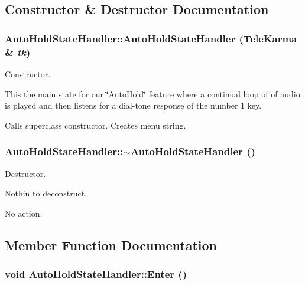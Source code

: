 \subsection{Constructor \& Destructor Documentation}
\hypertarget{classAutoHoldStateHandler_3537482b30296c65f6380f25291a8d3d}{
\subsubsection[{AutoHoldStateHandler}]{\setlength{\rightskip}{0pt plus 5cm}AutoHoldStateHandler::AutoHoldStateHandler ({\bf TeleKarma} \& {\em tk})}}
\label{classAutoHoldStateHandler_3537482b30296c65f6380f25291a8d3d}


Constructor. 

This the main state for our \char`\"{}AutoHold\char`\"{} feature where a continual loop of of audio is played and then listens for a dial-tone response of the number 1 key.

Calls superclass constructor. Creates menu string. \hypertarget{classAutoHoldStateHandler_b4022aa559ad037e07fbd4f9a395d3f6}{
\subsubsection[{$\sim$AutoHoldStateHandler}]{\setlength{\rightskip}{0pt plus 5cm}AutoHoldStateHandler::$\sim$AutoHoldStateHandler ()}}
\label{classAutoHoldStateHandler_b4022aa559ad037e07fbd4f9a395d3f6}


Destructor. 

Nothin to deconstruct.

No action.

\subsection{Member Function Documentation}
\hypertarget{classAutoHoldStateHandler_e2ceac17b4e28f9ca869bd0130659aad}{
\subsubsection[{Enter}]{\setlength{\rightskip}{0pt plus 5cm}void AutoHoldStateHandler::Enter ()}}
\label{classAutoHoldStateHandler_e2ceac17b4e28f9ca869bd0130659aad}


